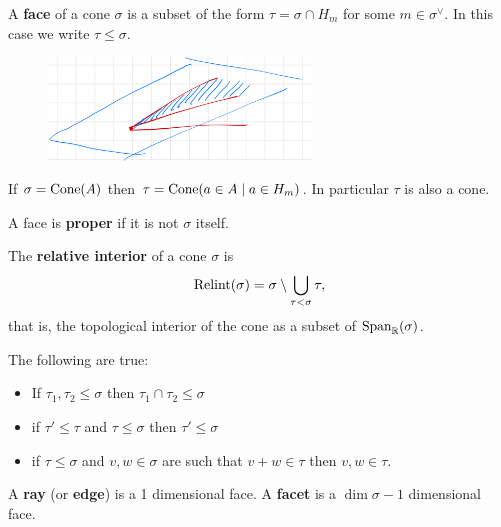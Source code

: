 \begin{definition}[]
A \textbf{face} of a cone $\sigma$ is a subset of the form $\tau=\sigma\cap H_m$ for some $m\in \sigma^\vee$. In this case we write $\tau\leq \sigma$.
\end{definition}
\begin{figure}[!htb]
	\centering
	\includegraphics[width=7cm]{Images/face.png}
\end{figure}



\begin{remark}
If $\sigma=\operatorname{Cone}(A)$ then $\tau=\operatorname{Cone}(a\in A\mid a\in H_m)$. In particular $\tau$ is also a cone.
\end{remark}


\begin{definition}[]
A face is \textbf{proper} if it is not $\sigma$ itself.
\end{definition}

\begin{definition}[]
The \textbf{relative interior} of a cone $\sigma$ is
\[\operatorname{Relint}(\sigma)=\sigma\setminus \bigcup_{\tau<\sigma}\tau,\]
that is, the topological interior of the cone as a subset of $\operatorname{Span}_{\mathbb{R}}(\sigma)$.
\end{definition}

\begin{fact}
The following are true:
\begin{itemize}
\item If $\tau_1,\tau_2\leq \sigma$ then $\tau_1\cap \tau_2\leq \sigma$
\item if $\tau'\leq \tau$ and $\tau\leq \sigma$ then $\tau'\leq \sigma$
\item if $\tau\leq \sigma$ and $v,w\in \sigma$ are such that $v+w\in \tau$ then $v,w\in \tau$.
\end{itemize}
\end{fact}



\begin{definition}[]
A \textbf{ray} (or \textbf{edge}) is a 1 dimensional face. A \textbf{facet} is a $\dim\sigma-1$ dimensional face.
\end{definition}


